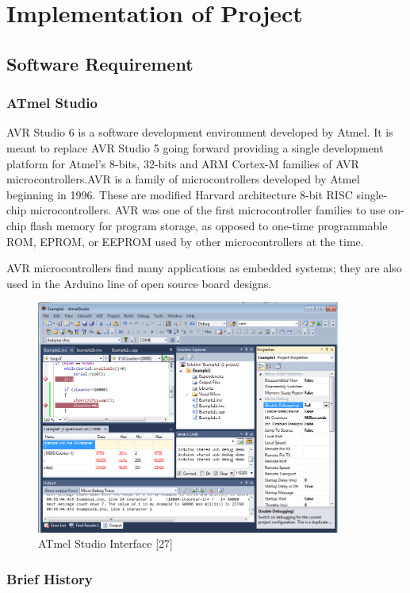 \documentclass[twoside,a4paper,16pt]{book}
\begin{document}
{{\chapter{\bf Implementation of Project }
\section{Software Requirement }
\subsection{ATmel Studio}
AVR Studio 6 is a software development environment developed by Atmel. It is meant to replace AVR Studio 5 going forward providing a single development platform for Atmel's 8-bits, 32-bits and ARM Cortex-M families of AVR microcontrollers.AVR is a family of microcontrollers developed by Atmel beginning in 1996. These are modified Harvard architecture 8-bit RISC single-chip microcontrollers. AVR was one of the first microcontroller families to use on-chip flash memory for program storage, as opposed to one-time programmable ROM, EPROM, or EEPROM used by other microcontrollers at the time.

AVR microcontrollers find many applications as embedded systems; they are also used in the Arduino line of open source board designs.

\begin{figure}
	\begin{center}
		\includegraphics[width=10.0cm]{cc.png}
		\caption{ATmel Studio Interface [27]}
	\end{center}
\end{figure}
\subsection*{Brief History}

}}
\end{document}
